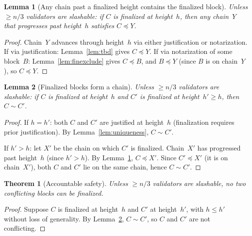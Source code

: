 \ifx\litemode\undefined\documentclass{article}\fi
\theoremstyle{plain}
\newtheorem{theorem}{Theorem}
\newtheorem{lemma}{Lemma}
\theoremstyle{definition}
\theoremstyle{remark}
\begin{document}
\begin{lemma}[Any chain past a finalized height contains the finalized block]\label{lem:mainsafety}
Unless $\geq n/3$ validators are slashable: if $C$ is finalized at height~$h$, then any chain~$Y$ that progresses past height~$h$ satisfies $C \preceq Y$.
\end{lemma}

\begin{proof}
Chain~$Y$ advances through height~$h$ via either justification or notarization.
If via justification: Lemma~\ref{lem:tbd} gives $C \preceq Y$.
If via notarization of some block~$B$: Lemma~\ref{lem:finexclude} gives $C \preceq B$, and $B \preceq Y$ (since $B$ is on chain~$Y$), so $C \preceq Y$.
\end{proof}

\begin{lemma}[Finalized blocks form a chain]\label{lem:finchain}
Unless $\geq n/3$ validators are slashable: if $C$ is finalized at height~$h$ and $C'$ is finalized at height~$h' \geq h$, then $C \sim C'$.
\end{lemma}

\begin{proof}
If $h = h'$: both $C$ and $C'$ are justified at height~$h$ (finalization requires prior justification).
By Lemma~\ref{lem:uniqueness}, $C \sim C'$.

If $h' > h$: let $X'$ be the chain on which $C'$ is finalized.
Chain~$X'$ has progressed past height~$h$ (since $h' > h$).
By Lemma~\ref{lem:mainsafety}, $C \preceq X'$.
Since $C' \preceq X'$ (it is on chain~$X'$), both $C$ and $C'$ lie on the same chain, hence $C \sim C'$.
\end{proof}

\begin{theorem}[Accountable safety]\label{thm:safety}
Unless $\geq n/3$ validators are slashable, no two conflicting blocks can be finalized.
\end{theorem}

\begin{proof}
Suppose $C$ is finalized at height~$h$ and $C'$ at height~$h'$, with $h \leq h'$ without loss of generality.
By Lemma~\ref{lem:finchain}, $C \sim C'$, so $C$ and $C'$ are not conflicting.
\end{proof}
\end{document}
